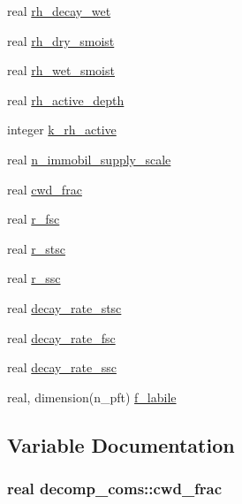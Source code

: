 \begin{DoxyCompactItemize}
\item 
real \hyperlink{namespacedecomp__coms_a49939319c35a32768b1106977d01b956}{rh\+\_\+decay\+\_\+wet}
\item 
real \hyperlink{namespacedecomp__coms_a376a5f59af3fff1df41ee2526e12d770}{rh\+\_\+dry\+\_\+smoist}
\item 
real \hyperlink{namespacedecomp__coms_a44a77512c0fb885ba9e4466402acd9c7}{rh\+\_\+wet\+\_\+smoist}
\item 
real \hyperlink{namespacedecomp__coms_a341e2649f9bd1e218c98505c0b7ce787}{rh\+\_\+active\+\_\+depth}
\item 
integer \hyperlink{namespacedecomp__coms_ad0a2f36f4bb43093696721e09df4a9e9}{k\+\_\+rh\+\_\+active}
\item 
real \hyperlink{namespacedecomp__coms_a75e582cc925b90448eed4ff7320fce15}{n\+\_\+immobil\+\_\+supply\+\_\+scale}
\item 
real \hyperlink{namespacedecomp__coms_a98eb32e300e06da7e5f6f8c75cdf1b01}{cwd\+\_\+frac}
\item 
real \hyperlink{namespacedecomp__coms_a0bef042050b97eeb7d14266674efd4fd}{r\+\_\+fsc}
\item 
real \hyperlink{namespacedecomp__coms_a632207b6b921ec9332d72826f6f92425}{r\+\_\+stsc}
\item 
real \hyperlink{namespacedecomp__coms_a039995e3414a2ec7fbabdb27f801425b}{r\+\_\+ssc}
\item 
real \hyperlink{namespacedecomp__coms_a6e61ed0b816c5e67c3163a235644aa5f}{decay\+\_\+rate\+\_\+stsc}
\item 
real \hyperlink{namespacedecomp__coms_afb3b626ea1538ffe9fda37c6be99fd2e}{decay\+\_\+rate\+\_\+fsc}
\item 
real \hyperlink{namespacedecomp__coms_a4f019556e7a13ea97a848a68f8aea865}{decay\+\_\+rate\+\_\+ssc}
\item 
real, dimension(n\+\_\+pft) \hyperlink{namespacedecomp__coms_a073b9f7c8ba7d2817a8b7fb32737d871}{f\+\_\+labile}
\end{DoxyCompactItemize}


\subsection{Variable Documentation}
\subsubsection[{\texorpdfstring{cwd\+\_\+frac}{cwd_frac}}]{\setlength{\rightskip}{0pt plus 5cm}real decomp\+\_\+coms\+::cwd\+\_\+frac}\hypertarget{namespacedecomp__coms_a98eb32e300e06da7e5f6f8c75cdf1b01}{}\label{namespacedecomp__coms_a98eb32e300e06da7e5f6f8c75cdf1b01}
